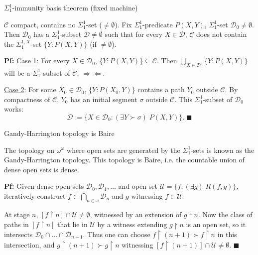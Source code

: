\begin{frame}{$\Sigma_1^{1}$-immunity basis theorem (fixed machine)}
  \begin{lemma*}
    $\mathcal{C}$ compact, contains no $\Sigma_1^{1}$-set
    ($\neq\emptyset$). Fix $\Sigma_1^{1}$-predicate $P(X,Y)$,
    $\Sigma_1^{1}$-set $\mathcal{D}_0\neq\emptyset$. Then
    $\mathcal{D}_0$ has a $\Sigma_1^{1}$-subset
    $\mathcal{D}\neq\emptyset$ such that for every $X\in\mathcal{D}$,
    $\mathcal{C}$ does not contain the $\Sigma_1^{1,X}$-set
    $\{Y:P(X,Y)\}$ (if $\neq\emptyset$).
  \end{lemma*}

  \vspace{1em}
  \textbf{Pf:} \underline{Case 1}: For every $X\in\mathcal{D}_0$,
  $\{Y:P(X,Y)\}\subseteq\mathcal{C}$. Then $\bigcup_{X\in\mathcal{D}_0}
  \{Y:P(X,Y)\}$ will be a $\Sigma_1^{1}$-subset of $\mathcal{C}$,
  $\Rightarrow\Leftarrow$.

  \vspace{1em}
  \underline{Case 2}: For some $X_0\in\mathcal{D}_0$, $\{Y:P(X_0,Y)\}$
  contains a path $Y_0$ outside $\mathcal{C}$. By compactness of
  $\mathcal{C}$, $Y_0$ has an initial segment $\sigma$ outside
  $\mathcal{C}$. This $\Sigma_1^{1}$-subset of $\mathcal{D}_0$ works:
  \[\mathcal{D}:= \{X\in\mathcal{D}_0: (\exists Y\succ\sigma)\; P(X,Y)\}.\;
  \blacksquare\]
\end{frame}

\begin{frame}{Gandy-Harrington topology is Baire}
  \begin{thm*}
    The topology on $\omega^\omega$ where open sets are generated by the
    $\Sigma_1^{1}$-sets is known as the Gandy-Harrington topology. This
    topology is Baire, i.e. the countable union of dense open sets is
    dense.
  \end{thm*}

  \vspace{1em}
  \textbf{Pf:} Given dense open sets $\mathcal{D}_0,\mathcal{D}_1,\ldots$
  and open set $\mathcal{U}=\{f:(\exists g)\; R(f,g)\}$, iteratively
  construct $f\in\bigcap_{n\in\omega}\mathcal{D}_n$ and $g$ witnessing
  $f\in\mathcal{U}$:
  
  \vspace{1em}
  At stage $n$, $[f\restriction n]\cap\mathcal{U} \neq\emptyset$, witnessed
  by an extension of $g\restriction n$. Now the class of paths in
  $[f\restriction n]$ that lie in $\mathcal{U}$ by a witness extending
  $g\restriction n$ is an open set, so it intersects
  $\mathcal{D}_0\cap\ldots\cap\mathcal{D}_{n+1}$. Thus one can choose
  $f\restriction (n+1) \succ f\restriction n$ in this intersection, and
  $g\restriction (n+1) \succ g\restriction n$ witnessing $[f\restriction
  (n+1)]\cap\mathcal{U} \neq\emptyset$. $\blacksquare$
\end{frame}

